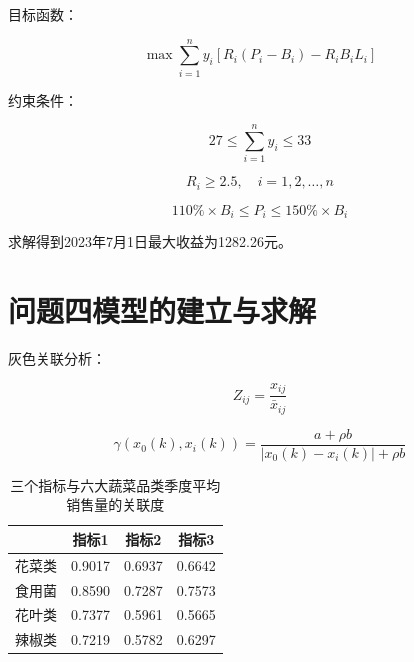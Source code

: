\documentclass[a4paper,12pt]{article}
\begin{document}
	目标函数：
	
	\begin{equation}
		\max \sum_{i=1}^{n} y_i \left[ R_i(P_i - B_i) - R_i B_i L_i \right]
		\label{eq:obj3}
	\end{equation}
	
	约束条件：
	
	\begin{equation}
		27 \leq \sum_{i=1}^{n} y_i \leq 33
		\label{eq:const3_1}
	\end{equation}
	
	\begin{equation}
		R_i \geq 2.5, \quad i=1,2,\dots,n
		\label{eq:const3_2}
	\end{equation}
	
	\begin{equation}
		110\% \times B_i \leq P_i \leq 150\% \times B_i
		\label{eq:const3_3}
	\end{equation}
	
	求解得到2023年7月1日最大收益为1282.26元。
	
	\newpage
	
	\section{问题四模型的建立与求解}
	
	灰色关联分析：
	
	\begin{equation}
		Z_{ij} = \frac{x_{ij}}{\bar{x}_{ij}}
		\label{eq:normalize}
	\end{equation}
	
	\begin{equation}
		\gamma(x_0(k), x_i(k)) = \frac{a + \rho b}{|x_0(k) - x_i(k)| + \rho b}
		\label{eq:grey_corr}
	\end{equation}
	
	\begin{table}[H]
		\centering
		\caption{三个指标与六大蔬菜品类季度平均销售量的关联度}
		\begin{tabular}{c|c|c|c}
			\hline
			\textbf{} & \textbf{指标1} & \textbf{指标2} & \textbf{指标3} \\
			\hline
			花菜类 & 0.9017 & 0.6937 & 0.6642 \\
			食用菌 & 0.8590 & 0.7287 & 0.7573 \\
			花叶类 & 0.7377 & 0.5961 & 0.5665 \\
			辣椒类 & 0.7219 & 0.5782 & 0.6297 \\
			\hline
		\end{tabular}
	\end{table}
	
\end{document}
